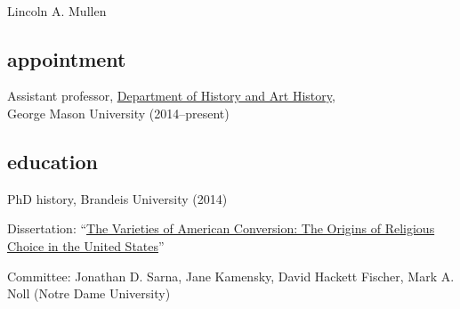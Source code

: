 \documentclass[11pt]{article}
\begin{document}
\thispagestyle{fancy}
\fancyfoot{}
\fancyhead{}
\renewcommand{\headrulewidth}{0pt}

\hfill\hfill\hfill
\hfill\hfill\hfill
\hfill\hfill\hfill
\hfill\hfill\hfill
\begin{minipage}[t]{1.4in}
   \\
\end{minipage}
\hfill
\begin{minipage}[t]{1.9in}
\end{minipage}

\vspace{0.1in}

{\Large Lincoln A. Mullen}\\[-0.1in]

\subsection{appointment}\label{appointment}

Assistant professor, \href{http://historyarthistory.gmu.edu/}{Department
  of History and Art History},\\George Mason University (2014--present)

\subsection{education}\label{education}

PhD history, Brandeis University (2014)

\hfill\begin{minipage}{6.25in}

Dissertation: ``\href{/research/\#dissertation}{The Varieties of American Conversion: The Origins of Religious Choice in the United States}''

Committee: Jonathan D. Sarna, Jane Kamensky, David Hackett Fischer, Mark A. Noll 
(Notre Dame University)

\end{minipage}
\end{document}
